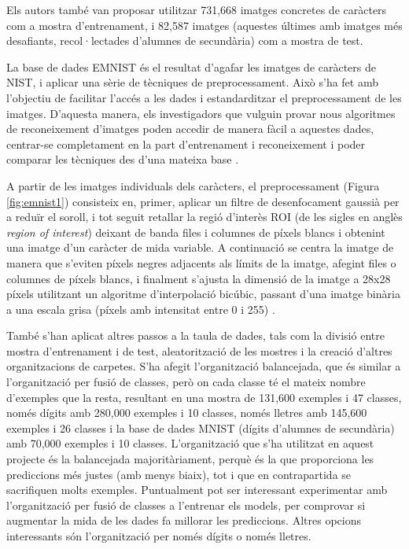 \documentclass[12pt, spanish]{article}
\begin{document}
Els autors també van proposar utilitzar 731,668 imatges concretes de caràcters com a mostra d'entrenament, i 82,587 imatges (aquestes últimes amb imatges més desafiants, recol·lectades d'alumnes de secundària) com a mostra de test.

La base de dades EMNIST és el resultat d'agafar les imatges de caràcters de NIST, i aplicar una sèrie de tècniques de preprocessament. Això s'ha fet amb l'objectiu de facilitar l'accés a les dades i estandarditzar el preprocessament de les imatges. D'aquesta manera, els investigadors que vulguin provar nous algoritmes de reconeixement d'imatges poden accedir de manera fàcil a aquestes dades, centrar-se completament en la part d'entrenament  i reconeixement i poder comparar les tècniques des d'una mateixa base \cite{EMNIST}. 

A partir de les imatges individuals dels caràcters, el preprocessament (Figura \ref{fig:emnist1}) consisteix en, primer, aplicar un filtre de desenfocament gaussià per a reduïr el soroll, i tot seguit retallar la regió d'interès ROI (de les sigles en anglès \textit{region of interest}) deixant de banda files i columnes de píxels blancs i obtenint una imatge d'un caràcter de mida variable. A continuació se centra la imatge de manera que s'eviten píxels negres adjacents als límits de la imatge, afegint files o columnes de píxels blancs, i finalment s'ajusta la dimensió de la imatge a 28x28 píxels utilitzant un algoritme d'interpolació bicúbic, passant d'una imatge binària a una escala grisa (píxels amb intensitat entre 0 i 255)  \cite{EMNIST}.

També s'han aplicat altres passos a la taula de dades, tals com la divisió entre mostra d'entrena\-ment i de test, aleatorització de les mostres i la creació d'altres organitzacions de carpetes. S'ha afegit l'organització balancejada, que és similar a l'organització per fusió de classes, però on cada classe té el mateix nombre d'exemples que la resta, resultant en una mostra de 131,600 exemples i 47 classes, només dígits amb 280,000 exemples i 10 classes, només lletres amb 145,600 exemples i 26 classes i la base de dades MNIST (dígits d'alumnes de secundària) amb 70,000 exemples i 10 classes. L'organització que s'ha utilitzat en aquest projecte és la balancejada majoritàriament, perquè és la que proporciona les prediccions més justes (amb menys biaix), tot i que en contrapartida se sacrifiquen molts exemples. Puntualment pot ser interessant experimentar amb l'organització per fusió de classes a l'entrenar els models, per comprovar si augmentar la mida de les dades fa millorar les prediccions. Altres opcions interessants són l'organització per només dígits o només lletres.
\end{document}
